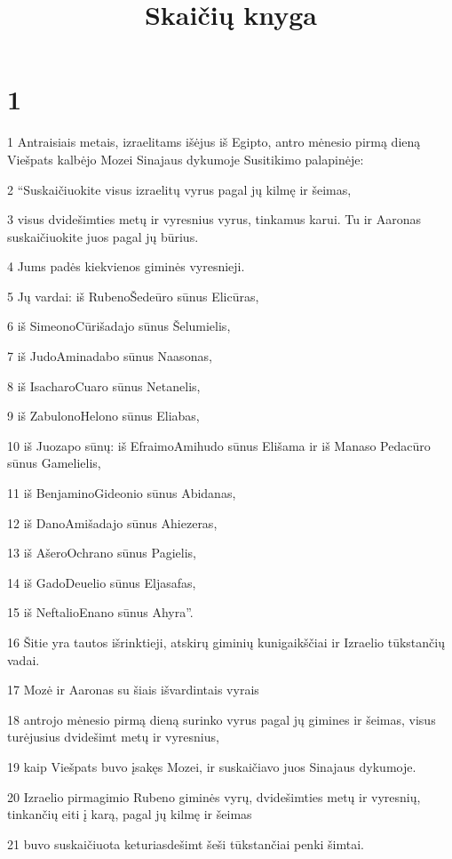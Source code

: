 

\title{Skaičių knyga}

\chapter{1}


\par 1 Antraisiais metais, izraelitams išėjus iš Egipto, antro mėnesio pirmą dieną Viešpats kalbėjo Mozei Sinajaus dykumoje Susitikimo palapinėje: 
\par 2 “Suskaičiuokite visus izraelitų vyrus pagal jų kilmę ir šeimas, 
\par 3 visus dvidešimties metų ir vyresnius vyrus, tinkamus karui. Tu ir Aaronas suskaičiuokite juos pagal jų būrius. 
\par 4 Jums padės kiekvienos giminės vyresnieji. 
\par 5 Jų vardai: iš Rubeno­Šedeūro sūnus Elicūras, 
\par 6 iš Simeono­Cūrišadajo sūnus Šelumielis, 
\par 7 iš Judo­Aminadabo sūnus Naasonas, 
\par 8 iš Isacharo­Cuaro sūnus Netanelis, 
\par 9 iš Zabulono­Helono sūnus Eliabas, 
\par 10 iš Juozapo sūnų: iš Efraimo­Amihudo sūnus Elišama ir iš Manaso­ Pedacūro sūnus Gamelielis, 
\par 11 iš Benjamino­Gideonio sūnus Abidanas, 
\par 12 iš Dano­Amišadajo sūnus Ahiezeras, 
\par 13 iš Ašero­Ochrano sūnus Pagielis, 
\par 14 iš Gado­Deuelio sūnus Eljasafas, 
\par 15 iš Neftalio­Enano sūnus Ahyra”. 
\par 16 Šitie yra tautos išrinktieji, atskirų giminių kunigaikščiai ir Izraelio tūkstančių vadai. 
\par 17 Mozė ir Aaronas su šiais išvardintais vyrais 
\par 18 antrojo mėnesio pirmą dieną surinko vyrus pagal jų gimines ir šeimas, visus turėjusius dvidešimt metų ir vyresnius, 
\par 19 kaip Viešpats buvo įsakęs Mozei, ir suskaičiavo juos Sinajaus dykumoje. 
\par 20 Izraelio pirmagimio Rubeno giminės vyrų, dvidešimties metų ir vyresnių, tinkančių eiti į karą, pagal jų kilmę ir šeimas 
\par 21 buvo suskaičiuota keturiasdešimt šeši tūkstančiai penki šimtai. 
